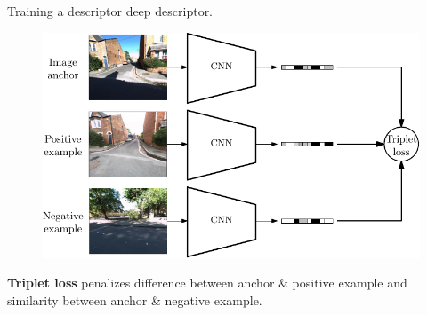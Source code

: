 \begin{frame}{Training a descriptor}
{	deep descriptor.
	}
	\only<3>
	{
	\begin{figure}
	\centering
	\includegraphics[width=0.7\linewidth]{vect/method/fig2/3}
	\end{figure}	
	\vfill
	\textbf{Triplet loss} penalizes difference between anchor \& positive example and similarity between anchor \& negative example.
	}
\end{frame}

